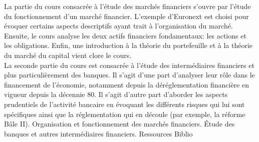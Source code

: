 \documentclass[10pt, a5paper]{report}
\begin{document}
\vfill


{
La partie du cours consacrée à l'étude des marchés financiers s'ouvre par l'étude du fonctionnement d'un marché financier. L'exemple d'Euronext est choisi pour évoquer certains aspects descriptifs ayant trait à l'organisation du marché. Ensuite, le cours analyse les deux actifs financiers fondamentaux: les actions et les obligations. Enfin, une introduction à la théorie du portefeuille et à la théorie du marché du capital vient clore le cours.\\
La seconde partie du cours est consacrée à l'étude des intermédiaires financiers et plus particulièrement des banques. Il s'agit d'une part d'analyser leur rôle dans le financement de l'économie, notamment depuis la déréglementation financière en vigueur depuis la décennie 80. Il s'agit d'autre part d'aborder les aspects prudentiels de l'activité bancaire en évoquant les différents risques qui lui sont spécifiques ainsi que la réglementation qui en découle (par exemple, la réforme Bâle II).
}
{}
{Organisation et fonctionnement des marchés financiers. \'Etude des banques et autres intermédiaires financiers.}
{Ressources}
{Biblio}
 
\vfill

\end{document}
